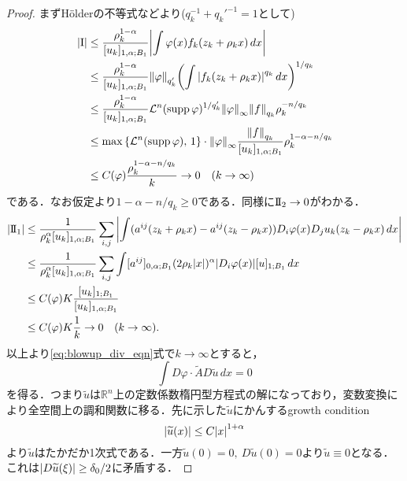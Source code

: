 \documentclass[a4paper]{ltjsarticle}
\newcommand{\Rset}{\mathbb{R}}
\newcommand{\Lm}{\mathcal{L}}
\newcommand{\one}{\mathrm{I}}
\newcommand{\two}{\mathrm{I}\hspace{-1.2pt}\mathrm{I}}
\newcommand{\1}{\mathbbm{1}}
\DeclareMathOperator{\supp}{\mathrm{supp}}
\numberwithin{equation}{section}
\theoremstyle{definition}
\begin{document}
\begin{proof}
    まずHölderの不等式などより($q_k^{-1}+q_k'^{-1}=1$として)
    \begin{align}
        \abs{\one}&\leq \frac{\rho_k^{1-\alpha}}{[u_k]_{1,\alpha;B_1}}\abs{\int \varphi(x)f_k(z_k+\rho_kx)\,dx}\\
        &\leq \frac{\rho_k^{1-\alpha}}{[u_k]_{1,\alpha;B_1}}\norm{\varphi}_{q_k'}\qty(\int\abs{ f_k(z_k+\rho_kx)}^{q_k}\,dx)^{1/q_k}\\
        &\leq \frac{\rho_k^{1-\alpha}}{[u_k]_{1,\alpha;B_1}}\Lm^n(\supp\varphi)^{1/q_k'}\norm{\varphi}_\infty \norm{f}_{q_k}\rho_k^{-n/q_k}\\
        &\leq \max\qty{\Lm^n(\supp\varphi),\,1}\cdot\norm{\varphi}_{\infty}\frac{\norm{f}_{q_k}}{[u_k]_{1,\alpha;B_1}}\rho_k^{1-\alpha-n/q_k}\\
        &\leq C(\varphi)\frac{\rho_k^{1-\alpha-n/q_k}}{k}\to0\quad (k\to\infty)  
    \end{align}
    である．なお仮定より$1-\alpha-n/q_k\geq0$である．同様に$\two_2\to0$がわかる．
    \begin{align}
        \abs{\two_1}&\leq \frac{1}{\rho_k^{\alpha}[u_k]_{1,\alpha;B_1}}\sum_{i,j}\abs{\int (a^{ij}(z_k+\rho_kx)-a^{ij}(z_k-\rho_kx))D_i\varphi(x)D_ju_k(z_k-\rho_kx)\,dx}\\
        &\leq \frac{1}{\rho_k^\alpha [u_k]_{1,\alpha;B_1}}\sum_{i,j}\int[a^{ij}]_{0,\alpha;B_1}(2\rho_k\abs{x})^\alpha \abs{D_i\varphi(x)}[u]_{1;B_1}\,dx\\
        &\leq C(\varphi)K\frac{[u_k]_{1;B_1}}{[u_k]_{1,\alpha;B_1}}\\
        &\leq C(\varphi)K\frac{1}{k}\to0\quad (k\to\infty).
    \end{align}
    以上より\eqref{eq:blowup_div_eqn}式で$k\to\infty$とすると，
    \begin{equation}
        \int D\varphi\cdot \widetilde{A}D\widetilde{u}\,dx=0 
    \end{equation}
    を得る．つまり$\widetilde{u}$は$\Rset^n$上の定数係数楕円型方程式の解になっており，変数変換により全空間上の調和関数に移る．先に示した$\widetilde{u}$にかんするgrowth condition
    \begin{equation}
        \abs{\widetilde{u}(x)}\leq C\abs{x}^{1+\alpha}
    \end{equation}
    より$\widetilde{u}$はたかだか1次式である．一方$\widetilde{u}(0)=0,\ D\widetilde{u}(0)=0$より$\widetilde{u}\equiv0$となる．これは$\abs{D\widetilde{u}(\xi)}\geq \delta_0/2$に矛盾する．
\end{proof}
\end{document}
